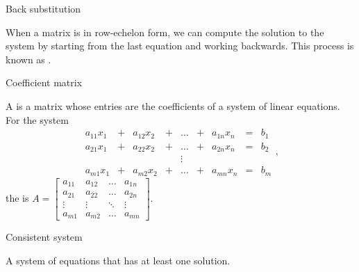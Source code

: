 \documentclass{ximera}
\begin{document}


Back substitution
\begin{expandable}
When a matrix is in row-echelon form, we can compute the solution to the system by starting from the last equation and working backwards.  This process is known as .
\end{expandable}



Coefficient matrix
\begin{expandable}
    A  is a matrix whose entries are the coefficients of a system of linear equations.  For the system $$\begin{array}{ccccccccc}
      a_{11}x_1 &+ &a_{12}x_2&+&\ldots&+&a_{1n}x_n&= &b_1 \\
	 a_{21}x_1 &+ &a_{22}x_2&+&\ldots&+&a_{2n}x_n&= &b_2 \\
     &&&&\vdots&&&& \\
     a_{m1}x_1 &+ &a_{m2}x_2&+&\ldots&+&a_{mn}x_n&= &b_m
    \end{array},$$ 
    the  is $A=\begin{bmatrix}a_{11}&a_{12}&\ldots&a_{1n}\\a_{21}&a_{22}&\ldots&a_{2n}\\\vdots&\vdots&\ddots&\vdots\\a_{m1}&a_{m2}&\ldots&a_{mn}\end{bmatrix}$.
\end{expandable}


Consistent system
\begin{expandable}
    A system of equations that has at least one solution.
\end{expandable}

\end{document}
